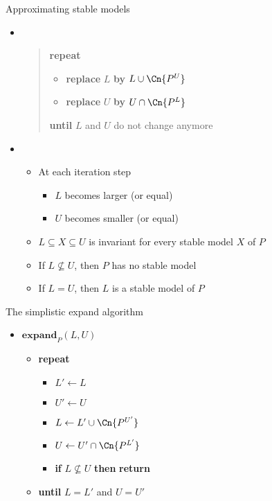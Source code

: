\begin{frame}{Approximating stable models}
  \begin{itemize}
  \item {} \
    \medskip

    \begin{quote}
    \textbf{repeat}
    \begin{itemize}
    \item[] \textbf{replace} $L$ \textbf{by} $L\cup\Cn{P^U}$
    \item[] \textbf{replace} $U$ \textbf{by} $U\cap\Cn{P^L}$
    \end{itemize}
    \textbf{until} $L$ and $U$ do not change anymore
    \end{quote}

  \item<2->  \
    \begin{itemize}\itemsep .5ex
    \item At each iteration step
      \begin{itemize}
      \item $L$ becomes larger (or equal)
      \item $U$ becomes smaller (or equal)
      \end{itemize}
    \item $L\subseteq X\subseteq U$ is invariant for every stable model $X$ of $P$
      \medskip
    \item<3-> If $L\not\subseteq U$, then $P$ has no stable model
    \item<4-> If $L=U$, then $L$ is a stable model of $P$
    \end{itemize}
  \end{itemize}
\end{frame}
\begin{frame}{The simplistic expand algorithm}
  \bigskip
  \begin{itemize}
  \item[] $\mathbf{expand}_{P}(L,U)$ \
    \begin{itemize}\normalsize
    \item[] \textbf{repeat} \
      \begin{itemize}\normalsize
      \item [] $L'\leftarrow L$
      \item [] $U'\leftarrow U$
        \smallskip
      \item [] $L\leftarrow L'\cup\Cn{P^{U'}}$
      \item [] $U\leftarrow U'\cap\Cn{P^{L'}}$
        \smallskip
      \item [] \textbf{if} $L\not\subseteq U$ \textbf{then} \textbf{return}
        \smallskip
      \end{itemize}
    \item[]\textbf{until} $L=L'$ and $U=U'$
    \end{itemize}
  \end{itemize}
\end{frame}
